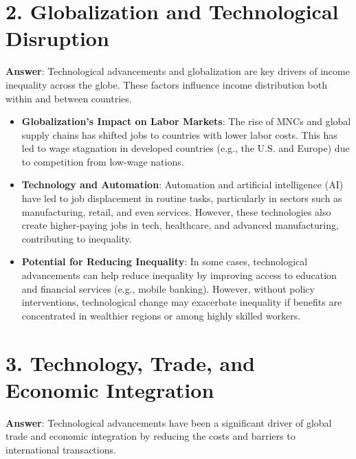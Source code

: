 \documentclass{article}
\begin{document}
\section*{2. Globalization and Technological Disruption}
\textbf{Answer}:  
Technological advancements and globalization are key drivers of income inequality across the globe. These factors influence income distribution both within and between countries.

\begin{itemize}
    \item \textbf{Globalization's Impact on Labor Markets}:
    The rise of MNCs and global supply chains has shifted jobs to countries with lower labor costs. This has led to wage stagnation in developed countries (e.g., the U.S. and Europe) due to competition from low-wage nations.
    
    \item \textbf{Technology and Automation}:  
    Automation and artificial intelligence (AI) have led to job displacement in routine tasks, particularly in sectors such as manufacturing, retail, and even services. However, these technologies also create higher-paying jobs in tech, healthcare, and advanced manufacturing, contributing to inequality.
    
    \item \textbf{Potential for Reducing Inequality}:  
    In some cases, technological advancements can help reduce inequality by improving access to education and financial services (e.g., mobile banking). However, without policy interventions, technological change may exacerbate inequality if benefits are concentrated in wealthier regions or among highly skilled workers.
\end{itemize}

\section*{3. Technology, Trade, and Economic Integration}
\textbf{Answer}:  
Technological advancements have been a significant driver of global trade and economic integration by reducing the costs and barriers to international transactions.
\end{document}
